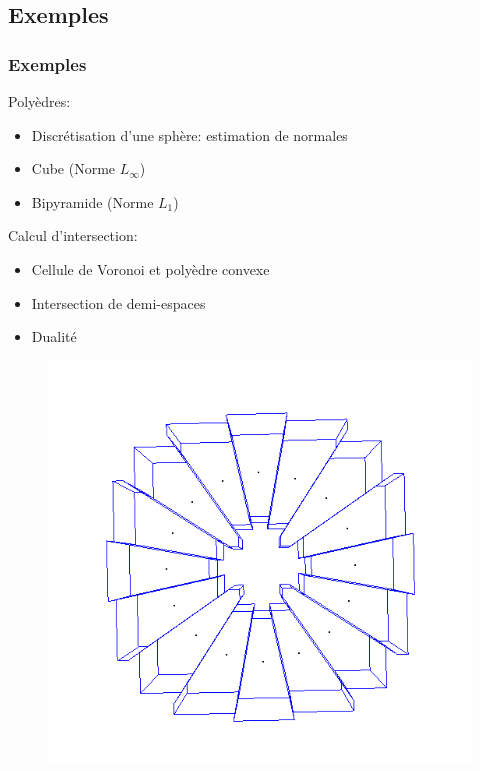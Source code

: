 \documentclass{beamer}
\begin{document}
\subsection{Exemples}
\begin{frame}
    \frametitle{Exemples}

    Polyèdres:
    \begin{itemize}
        \item Discrétisation d'une sphère: estimation de normales
        \item Cube (Norme $ L_{\infty} $)
        \item Bipyramide (Norme $ L_1 $)
    \end{itemize}

    Calcul d'intersection:
    \begin{itemize}
        \item Cellule de Voronoi et polyèdre convexe
        \item Intersection de demi-espaces
        \item Dualité
    \end{itemize}

    \begin{figure}
        \centering
        \includegraphics[scale=0.2]{img/circle-cube-inter}
    \end{figure}
\end{frame}
\end{document}
